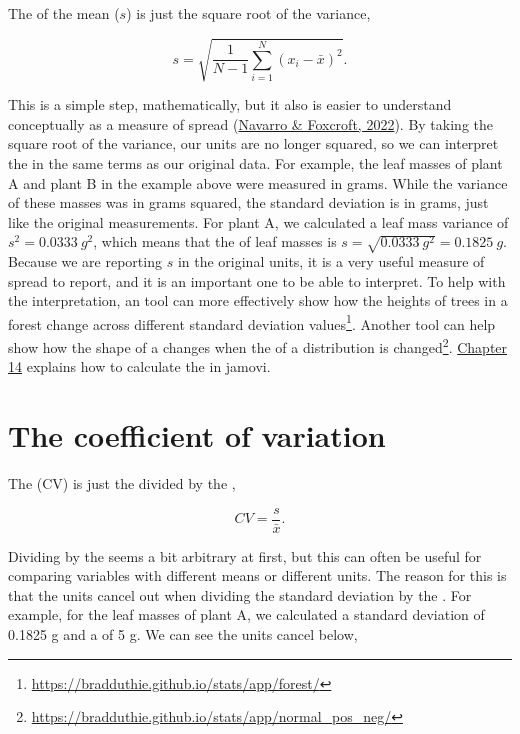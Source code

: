 \documentclass[
  openany]{krantz}
\begin{document}
The  of the mean (\(s\)) is just the square root of the variance,

\[s = \sqrt{\frac{1}{N - 1}\sum_{i = 1}^{N}\left(x_{i} - \bar{x} \right)^{2}}.\]

This is a simple step, mathematically, but it also is easier to understand conceptually as a measure of spread (\protect\hyperlink{ref-Navarro2022}{Navarro \& Foxcroft, 2022}).
By taking the square root of the variance, our units are no longer squared, so we can interpret the  in the same terms as our original data.
For example, the leaf masses of plant A and plant B in the example above were measured in grams.
While the variance of these masses was in grams squared, the standard deviation is in grams, just like the original measurements.
For plant A, we calculated a leaf mass variance of \(s^{2} = 0.0333\:g^{2}\), which means that the  of leaf masses is \(s = \sqrt{0.0333\:g^{2}} = 0.1825\:g\).
Because we are reporting \(s\) in the original units, it is a very useful measure of spread to report, and it is an important one to be able to interpret.
To help with the interpretation, an  tool can more effectively show how the heights of trees in a forest change across different standard deviation values\footnote{\url{https://bradduthie.github.io/stats/app/forest/}}.
Another  tool can help show how the shape of a  changes when the  of a distribution is changed\footnote{\url{https://bradduthie.github.io/stats/app/normal_pos_neg/}}.
\protect\hyperlink{Chapter_14}{Chapter 14} explains how to calculate the  in jamovi.

\hypertarget{the-coefficient-of-variation}{%
\section{The coefficient of variation}\label{the-coefficient-of-variation}}

The  (CV) is just the  divided by the ,

\[CV = \frac{s}{\bar{x}}.\]

Dividing by the  seems a bit arbitrary at first, but this can often be useful for comparing variables with different means or different units.
The reason for this is that the units cancel out when dividing the standard deviation by the .
For example, for the leaf masses of plant A, we calculated a standard deviation of 0.1825 g and a  of 5 g.
We can see the units cancel below,
\end{document}
